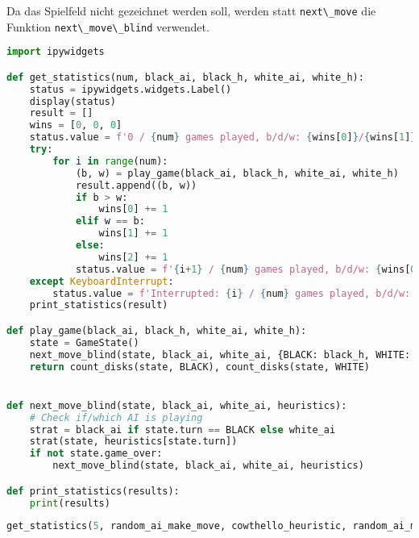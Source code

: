 Da das Spielfeld nicht gezeichnet werden soll, werden statt
\passthrough{\lstinline!next\_move!} die Funktion
\passthrough{\lstinline!next\_move\_blind!} verwendet.

\begin{lstlisting}[language=Python]
import ipywidgets

def get_statistics(num, black_ai, black_h, white_ai, white_h):
    status = ipywidgets.widgets.Label()
    display(status)
    result = []
    wins = [0, 0, 0]
    status.value = f'0 / {num} games played, b/d/w: {wins[0]}/{wins[1]}/{wins[2]}'
    try:
        for i in range(num):
            (b, w) = play_game(black_ai, black_h, white_ai, white_h)
            result.append((b, w))
            if b > w:
                wins[0] += 1
            elif w == b:
                wins[1] += 1
            else:
                wins[2] += 1
            status.value = f'{i+1} / {num} games played, b/d/w: {wins[0]}/{wins[1]}/{wins[2]}'
    except KeyboardInterrupt:
        status.value = f'Interrupted: {i} / {num} games played, b/d/w: {wins[0]}/{wins[1]}/{wins[2]}'
    print_statistics(result)

def play_game(black_ai, black_h, white_ai, white_h):
    state = GameState()
    next_move_blind(state, black_ai, white_ai, {BLACK: black_h, WHITE: white_h})
    return count_disks(state, BLACK), count_disks(state, WHITE)


def next_move_blind(state, black_ai, white_ai, heuristics):
    # Check if/which AI is playing
    strat = black_ai if state.turn == BLACK else white_ai
    strat(state, heuristics[state.turn])
    if not state.game_over:
        next_move_blind(state, black_ai, white_ai, heuristics)

def print_statistics(results):
    print(results)
\end{lstlisting}

\begin{lstlisting}[language=Python]
get_statistics(5, random_ai_make_move, cowthello_heuristic, random_ai_make_move, cowthello_heuristic)
\end{lstlisting}
